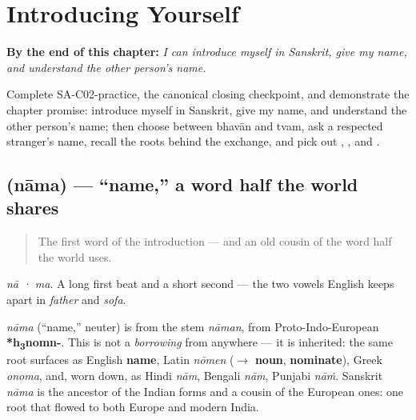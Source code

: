 
\chapter{Introducing Yourself}
\label{ch:introductions}

\begin{chapteropening}
\textbf{By the end of this chapter:} \emph{I can introduce myself in Sanskrit, give my name, and understand the other person's name.}

Complete SA-C02-practice, the canonical closing checkpoint, and demonstrate the chapter promise: introduce myself in Sanskrit, give my name, and understand the other person's name; then choose between bhavān and tvam, ask a respected stranger's name, recall the roots behind the exchange, and pick out , ,  and .
\end{chapteropening}

\section[\texorpdfstring{\sk{नाम} (nāma)}{नाम (nāma)}]{ (nāma) — \textquotedblleft{}name,\textquotedblright{} a word half the world shares}

\label{lesson:SA-C02-nama}



\begin{quote}
The first word of the introduction — and an old cousin of the word half the world uses.
\end{quote}

\begin{sounds}
\emph{nā · ma}. A long first beat and a short second — the two vowels English keeps apart in \emph{father} and \emph{sofa}.
\end{sounds}

\begin{cousinweb}
\emph{nāma} (\textquotedblleft{}name,\textquotedblright{} neuter) is from the stem \emph{nāman}, from Proto-Indo-European \textbf{*h\textsubscript{3}nomn-}. This is not a \emph{borrowing} from anywhere — it is inherited: the same root surfaces as English \textbf{name}, Latin \emph{nōmen} ($\to$ \textbf{noun}, \textbf{nominate}), Greek \emph{onoma}, and, worn down, as Hindi \emph{nām}, Bengali \emph{nām}, Punjabi \emph{nāṁ}. Sanskrit \emph{nāma} is the ancestor of the Indian forms and a cousin of the European ones: one root that flowed to both Europe and modern India.
\end{cousinweb}

